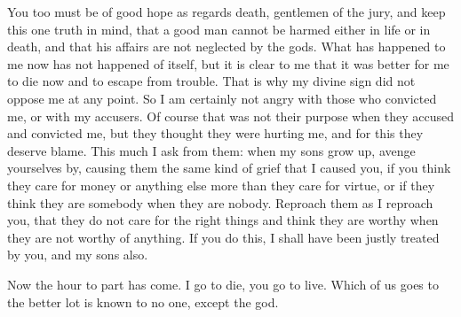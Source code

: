 You too must be of good hope as regards death, gentlemen of the jury, and keep this one truth
in mind, that a good man cannot be harmed either in life or in death, and that his affairs are not
neglected by the gods. What has happened to me now has not happened of itself, but it is clear to
me that it was better for me to die now and to escape from trouble. That is why my divine sign did
not oppose me at any point. So I am certainly not angry with those who convicted me, or with my
accusers. Of course that was not their purpose when they accused and convicted me, but they
thought they were hurting me, and for this they deserve blame. This much I ask from them: when
my sons grow up, avenge yourselves by, causing them the same kind of grief that I caused you, if
you think they care for money or anything else more than they care for virtue, or if they think they
are somebody when they are nobody. Reproach them as I reproach you, that they do not care for
the right things and think they are worthy when they are not worthy of anything. If you do this, I
shall have been justly treated by you, and my sons also.

Now the hour to part has come. I go to die, you go to live. Which of us goes to the better lot
is known to no one, except the god.